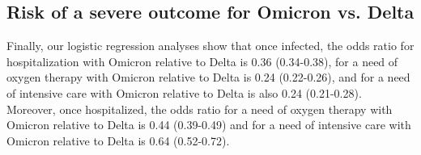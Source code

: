 \documentclass[9pt,twocolumn,twoside,lineno]{pnas-new}
\begin{document}
\subsection*{Risk of a severe outcome for Omicron vs. Delta}

Finally, our logistic regression analyses show that once infected, the odds ratio for hospitalization with Omicron relative to Delta is 0.36 (0.34-0.38), for a need of oxygen therapy with Omicron relative to Delta is 0.24 (0.22-0.26), and for a need of intensive care with Omicron relative to Delta is also 0.24 (0.21-0.28). Moreover, once hospitalized, the odds ratio for a need of oxygen therapy with Omicron relative to Delta is 0.44 (0.39-0.49) and for a need of intensive care with Omicron relative to Delta is 0.64 (0.52-0.72).

 
 
\end{document}
